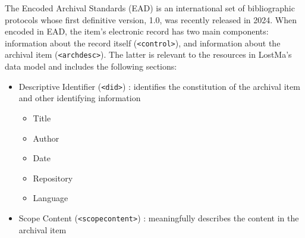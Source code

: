 The Encoded Archival Standards (EAD) is an international set of bibliographic protocols whose first definitive version, 1.0, was recently released in 2024. When encoded in EAD, the item's electronic record has two main components: information about the record itself (\texttt{<control>}), and information about the archival item (\texttt{<archdesc>}). The latter is relevant to the resources in LostMa's data model and includes the following sections:

\begin{itemize}
    \item Descriptive Identifier (\texttt{<did>}) : identifies the constitution of the archival item and other identifying information
    \begin{itemize}
        \item Title
        \item Author
        \item Date
        \item Repository
        \item Language
    \end{itemize}
    \item Scope Content (\texttt{<scopecontent>}) : meaningfully describes the content in the archival item
\end{itemize}
